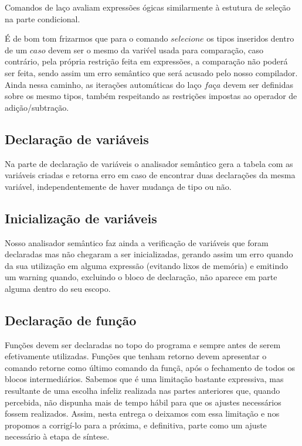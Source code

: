 \documentclass[a4paper,12pt]{report}
\begin{document}
Comandos de la\c{c}o avaliam express\~oes \'ogicas similarmente \`a estutura de sele\c{c}\~ao
na parte condicional.

\'E de bom tom frizarmos que para o comando $selecione$ os tipos inseridos dentro de um $caso$ 
devem ser o mesmo da vari\'vel usada para compara\c{c}\~ao, caso contr\'ario, pela pr\'opria 
restri\c{c}\~ao feita em express\~oes, a compara\c{c}\~ao n\~ao poder\'a ser feita, sendo assim 
um erro sem\^antico que ser\'a acusado pelo nosso compilador. Ainda nessa caminho, as 
itera\c{c}\~oes autom\'aticas do la\c{c}o $fa$\c{c}$a$ devem ser definidas sobre os mesmo
tipos, tamb\'em respeitando as restri\c{c}\~oes impostas ao operador de 
adi\c{c}\~ao/subtra\c{c}\~ao.

\subsection{Declara\c{c}\~ao de vari\'aveis}

Na parte de declara\c{c}\~ao de vari\'aveis o analisador sem\^antico gera a tabela com as 
vari\'aveis criadas e retorna erro em caso de encontrar duas declara\c{c}\~oes da mesma
vari\'avel, independentemente de haver mudan\c{c}a de tipo ou n\~ao.

\subsection{Inicializa\c{c}\~ao de vari\'aveis}

Nosso analisador sem\^antico faz ainda a verifica\c{c}\~ao de vari\'aveis que foram declaradas
mas n\~ao chegaram a ser inicializadas, gerando assim um erro quando da sua utiliza\c{c}\~ao em
alguma express\~ao (evitando lixos de mem\'oria) e emitindo um warning quando, excluindo o 
bloco de declara\c{c}\~ao, n\~ao aparece em parte alguma dentro do seu escopo.

\subsection{Declara\c{c}\~ao de fun\c{c}\~ao}

Fun\c{c}\~oes devem ser declaradas no topo do programa e sempre antes de serem efetivamente
utilizadas. Fun\c{c}\~oes que tenham retorno devem apresentar o comando retorne como \'ultimo
comando da fun\c{c}\~a, ap\'os o fechamento de todos os blocos intermedi\'arios.
Sabemos que \'e uma limita\c{c}\~ao bastante expressiva, mas resultante de uma escolha infeliz
realizada nas partes anteriores que, quando percebida, n\~ao dispunha mais de tempo h\'abil 
para que os ajustes necess\'arios fossem realizados. Assim, nesta entrega o deixamos com essa
limita\c{c}\~ao e nos propomos a corrig\'i-lo para a pr\'oxima, e definitiva, parte como um 
ajuste necess\'ario \`a etapa de s\'intese.
\end{document}
